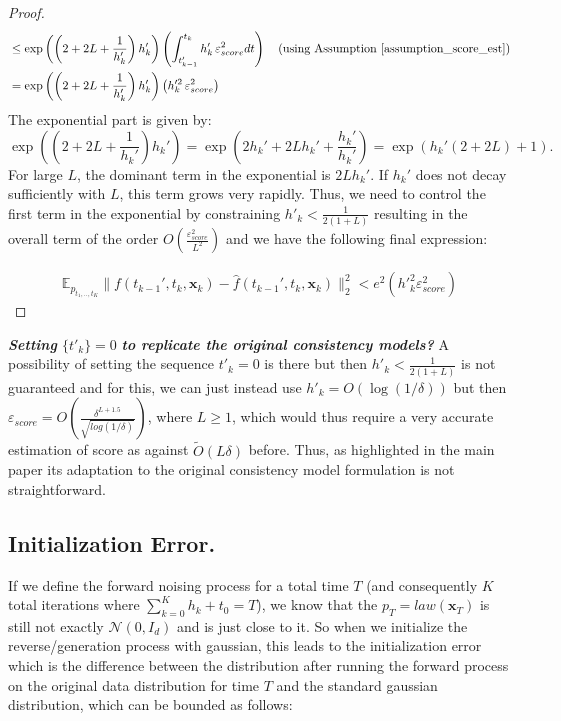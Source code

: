 \documentclass[11pt]{article}
\def\rvx{{\mathbf{x}}}
\newcommand{\E}{\mathbb{E}}
\begin{document}
\begin{proof}
\begin{align*}
& \leq \exp\left(\left(2 + 2L +  \frac{1}{h'_k} \right)h'_k\right)\left(  \int_{t'_{k-1}}^{t_k}  h'_{k}\, \varepsilon^2_{score} dt \right) \quad \text{(using Assumption \ref{assumption_score_est})} \\
&= \exp\left(\left(2 + 2L +  \frac{1}{h'_k} \right)h'_k\right)\left(    h'^2_{k}\, \varepsilon^2_{score} \right) \quad \\
\end{align*}
The exponential part is given by:
\[
\exp\left(\left(2 + 2L + \frac{1}{h_k'}\right) h_k'\right) = \exp\left(2h_k' + 2Lh_k' + \frac{h_k'}{h_k'}\right) = \exp\left(h_k'( 2 + 2L) + 1\right).
\]
For large \( L \), the dominant term in the exponential is \( 2Lh_k' \). If \( h_k' \) does not decay sufficiently with \( L \), this term grows very rapidly. Thus, we need to control the first term in the exponential by constraining $h'_k < \frac{1}{2(1+L)}$ resulting in the overall term of the order ${O}(\frac{\varepsilon^2_{score}}{L^2})$ and we have the following final expression:

\begin{align}
     \E_{{p}_{t_1,.., t_{K}}}  
  \|
  f(t_{k-1}',t_k,{\rvx}_k)-\hat{f}(t_{k-1}',t_k,{\rvx}_k)\|_2^2 < e^2({h'}_k^2\varepsilon^2_{score})
\end{align}

\end{proof}

\noindent
\textit{\textbf{Setting} $\{t'_k\} = 0$} \textit{\textbf{to replicate the original consistency models?}} A possibility of setting the sequence $t'_k=0$ is there but then $h'_k < \frac{1}{2(1+L)}$ is not guaranteed and for this, we can just instead use $h'_k={O}(\log(1/\delta))$ but then $\varepsilon_{score}={O}(\frac{\delta^{L+1.5}}{\sqrt{log(1/\delta)}})$, where $L\geq 1$, which would thus require a very accurate estimation of score as against $\tilde{O}(L\delta)$ before. Thus, as highlighted in the main paper its adaptation to the original consistency model formulation is not straightforward.\\

\noindent
\subsection{Initialization Error.} 
\label{appendix_init_error}
If we define the forward noising process for a total time $T$ (and consequently $K$ total iterations where $\sum_{k=0}^K h_k + t_0= T$), we know that the $p_T={law}(\rvx_T)$ is still not exactly $\mathcal{N}(0,I_d)$ and is just close to it. So when we initialize the reverse/generation process with gaussian, this leads to the initialization error which is the difference between the distribution after running the forward process on the original data distribution for time $T$ and the standard gaussian distribution, which can be bounded as follows: \\
\end{document}
